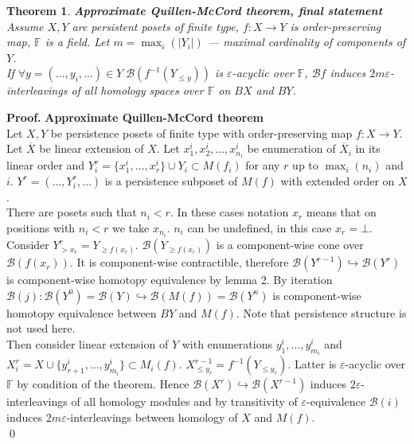 \documentclass[a4paper, 12pt]{article}
\newtheorem{theorem}{Theorem}
\theoremstyle{definition}
\theoremstyle{remark}
\newenvironment{pf}{\noindent\textbf{Proof.}}{\qed}
\renewcommand{\leq}{\leqslant}
\renewcommand{\geq}{\geqslant}
\begin{document}
\begin{theorem} \textbf{Approximate Quillen-McCord theorem, final statement}\\
  Assume $X, Y$ are persistent posets of finite type, $f : X \to Y$ is order-preserving map, $\mathbb{F}$ is a field. Let $m = \max_{i}(|Y_i|)$ --- maximal cardinality of components of $Y$.\\
  If $\forall y=(\ldots,y_i,\ldots) \in Y\;\mathcal{B}(f^{-1}(Y_{\leqslant y}))$ is $\varepsilon$-acyclic over $\mathbb{F}$, $\mathcal{B}f$ induces $2m\varepsilon$-interleavings of all homology spaces over $\mathbb{F}$ on $BX$ and $BY$.\\
\end{theorem}

\begin{pf} \textbf{Approximate Quillen-McCord theorem}\\
  Let $X, Y$ be persistence posets of finite type with order-preserving map $f : X \to Y$.\\

  Let $\overline{X}$ be linear extension of $X$. Let $x^i_1, x^i_2, \ldots, x^i_{n_i}$ be enumeration of $\overline{X}_i$ in its linear order and $Y_i^r = \{x^i_1,\ldots,x^i_r\} \cup Y_i \subset M(f_i)$ for any $r$ up to $\max_{i}(n_i)$ and $i$. $Y^r = (\ldots, Y_i^r, \ldots)$ is a persistence subposet of $M(f)$ with extended order on $X$.\\

  There are posets such that $n_i < r$. In these cases notation $x_r$ means that on positions with $n_i < r$ we take $x_{n_i}$. $n_i$ can be undefined, in this case $x_r = \bot$.\\

  Consider $Y^r_{>x_r} = Y_{\geq f(x_r)}$. $\mathcal{B}(Y_{\geq f(x_r)})$ is a component-wise cone over $\mathcal{B}(f(x_r))$. It is component-wise contractible, therefore $\mathcal{B}(Y^{r-1}) \hookrightarrow \mathcal{B}(Y^{r})$ is component-wise homotopy equivalence by lemma 2. By iteration $\mathcal{B}(j) : \mathcal{B}(Y^{0}) = \mathcal{B}(Y) \hookrightarrow \mathcal{B}(M(f)) = \mathcal{B}(Y^n)$ is component-wise homotopy equivalence between $BY$ and $M(f)$. Note that persistence structure is not used here.\\

  Then consider linear extension of $Y$ with enumerations $y^i_1,\ldots,y^i_{m_i}$ and $X_i^r = X \cup \{y^i_{r+1},\ldots,y^i_{m_i}\} \subset M_i(f)$. $X^{r-1}_{\leq y_r} = f^{-1}(Y_{\leqslant y_r})$. Latter is $\varepsilon$-acyclic over $\mathbb{F}$ by condition of the theorem. Hence $\mathcal{B}(X^{r}) \hookrightarrow \mathcal{B}(X^{r-1})$ induces $2\varepsilon$-interleavings of all homology modules and by transitivity of $\varepsilon$-equivalence $\mathcal{B}(i)$ induces $2m\varepsilon$-interleavings between homology of $X$ and $M(f)$.\\


\end{pf}
\end{document}
